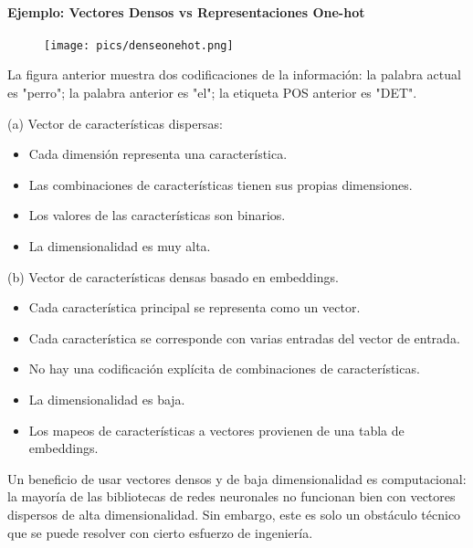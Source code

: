 \paragraph{Ejemplo: Vectores Densos vs Representaciones One-hot}

\begin{figure}[htb]
	\centering
	 \texttt{[image: pics/denseonehot.png]}
\end{figure}

La figura anterior muestra dos codificaciones de la información: la palabra actual es "perro"; la palabra anterior es "el"; la etiqueta POS anterior es "DET".

(a) Vector de características dispersas:
\begin{itemize}
 \item Cada dimensión representa una característica.
\item Las combinaciones de características tienen sus propias dimensiones.
\item Los valores de las características son binarios.
\item La dimensionalidad es muy alta.
\end{itemize}


(b) Vector de características densas basado en embeddings.

\begin{itemize}
\item Cada característica principal se representa como un vector.
\item  Cada característica se corresponde con varias entradas del vector de entrada.
\item No hay una codificación explícita de combinaciones de características.
\item La dimensionalidad es baja.
\item Los mapeos de características a vectores provienen de una tabla de embeddings.
\end{itemize}


Un beneficio de usar vectores densos y de baja dimensionalidad es computacional: la mayoría de las bibliotecas de redes neuronales no funcionan bien con vectores dispersos de alta dimensionalidad. Sin embargo, este es solo un obstáculo técnico que se puede resolver con cierto esfuerzo de ingeniería.

